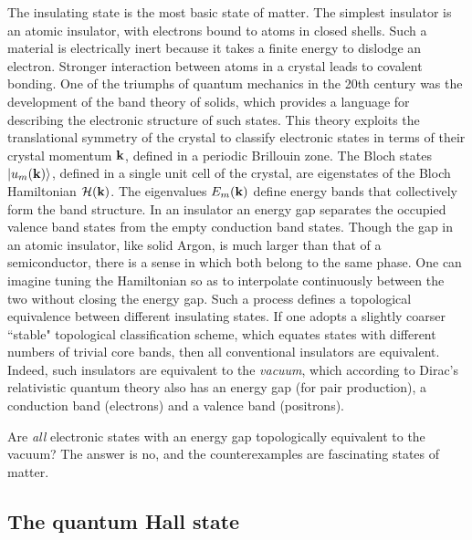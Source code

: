 \documentclass[twocolumn,floatfix,showpacs,rmp,aps]{revtex4}
\begin{document}
The insulating state is the most basic state of matter.  The simplest insulator is
an atomic insulator, with electrons bound to atoms in closed shells.
Such a material is electrically inert because it takes a finite energy to
dislodge an electron.  Stronger interaction between atoms in a crystal
leads to covalent bonding.  One of the triumphs of quantum
mechanics in the 20th century was the development of the band theory of solids,
which provides a language for describing the electronic structure of such
states.  This theory exploits the translational symmetry of the
crystal to classify electronic states in terms of their crystal momentum
${\bf k}$, defined in a periodic Brillouin zone.  The Bloch states
$|u_m({\bf k})\rangle$, defined in a single unit cell of the crystal,
are eigenstates of the Bloch Hamiltonian ${\cal H}({\bf k})$.
The eigenvalues $E_m({\bf k})$
define energy bands that collectively form the band structure.
In an insulator an energy
gap separates the occupied valence band states from the empty
conduction band states.  Though the gap in an atomic
insulator, like solid Argon, is much larger than that of a
semiconductor, there is a sense in
which both belong to the same phase.  One can imagine
tuning the Hamiltonian so as to interpolate continuously between the
two without closing the energy gap.  Such a process defines a topological
equivalence between different insulating states.
If one adopts a slightly coarser
``stable" topological classification scheme, which
equates states with different numbers of trivial core bands,
then all conventional
insulators are equivalent.  Indeed, such insulators are
equivalent to the {\it vacuum}, which according to Dirac's
relativistic quantum theory also has an energy gap (for pair production),
a conduction band (electrons) and a valence band (positrons).

Are {\it all} electronic states with an
energy gap topologically equivalent to the vacuum?  The answer
is no, and the counterexamples are fascinating
states of matter.


\subsection{The quantum Hall state}
\label{sec:qhall}
\end{document}
